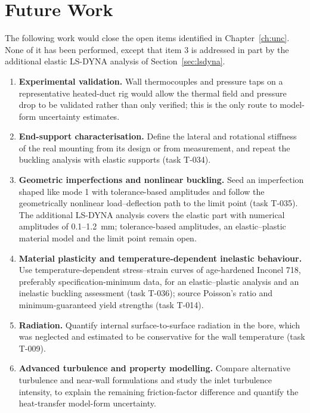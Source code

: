 \chapter{Future Work}\label{ch:future}
The following work would close the open items identified in Chapter~\ref{ch:unc}. None of it has been performed, except that item 3
is addressed in part by the additional elastic LS-DYNA analysis of Section~\ref{sec:lsdyna}.

\begin{enumerate}
\item \textbf{Experimental validation.} Wall thermocouples and pressure taps on a representative heated-duct rig would allow the thermal field and
      pressure drop to be validated rather than only verified; this is the only route to model-form uncertainty estimates.
\item \textbf{End-support characterisation.} Define the lateral and rotational stiffness of the real mounting from its design or from
      measurement, and repeat the buckling analysis with elastic supports (task T-034).
\item \textbf{Geometric imperfections and nonlinear buckling.} Seed an imperfection shaped like mode 1 with tolerance-based amplitudes and follow
      the geometrically nonlinear load--deflection path to the limit point (task T-035). The additional LS-DYNA analysis covers the
      elastic part with numerical amplitudes of 0.1--1.2~mm; tolerance-based amplitudes, an elastic--plastic material model and the
      limit point remain open.
\item \textbf{Material plasticity and temperature-dependent inelastic behaviour.} Use temperature-dependent stress--strain curves of age-hardened
      Inconel 718, preferably specification-minimum data, for an elastic--plastic analysis and an inelastic buckling assessment (task T-036);
      source Poisson's ratio and minimum-guaranteed yield strengths (task T-014).
\item \textbf{Radiation.} Quantify internal surface-to-surface radiation in the bore, which was neglected and estimated to be conservative for the
      wall temperature (task T-009).
\item \textbf{Advanced turbulence and property modelling.} Compare alternative turbulence and near-wall formulations and study the inlet
      turbulence intensity, to explain the remaining friction-factor difference and quantify the heat-transfer model-form uncertainty.

\end{enumerate}
